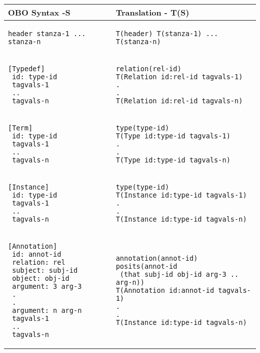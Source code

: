 \begin{scriptsize}
\setlongtables

\begin{longtable}{ | p{7cm} | p{7cm} |}
\hline
OBO Syntax -S & Translation - T(S)
\\ 

\hline
\begin{verbatim}
header stanza-1 ... stanza-n
\end{verbatim}
&
\begin{verbatim}
T(header) T(stanza-1) ... T(stanza-n)
\end{verbatim}
\\

\hline
\begin{verbatim}
[Typedef]
 id: type-id
 tagvals-1
 ..
 tagvals-n
\end{verbatim}
&
\begin{verbatim}
relation(rel-id)
T(Relation id:rel-id tagvals-1)
.
.
T(Relation id:rel-id tagvals-n)
\end{verbatim}
\\

\hline
\begin{verbatim}
[Term]
 id: type-id
 tagvals-1
 ..
 tagvals-n
\end{verbatim}
&
\begin{verbatim}
type(type-id)
T(Type id:type-id tagvals-1)
.
.
T(Type id:type-id tagvals-n)
\end{verbatim}
\\

\hline
\begin{verbatim}
[Instance]
 id: type-id
 tagvals-1
 ..
 tagvals-n
\end{verbatim}
&
\begin{verbatim}
type(type-id)
T(Instance id:type-id tagvals-1)
.
.
T(Instance id:type-id tagvals-n)
\end{verbatim}
\\

\hline
\begin{verbatim}
[Annotation]
 id: annot-id
 relation: rel
 subject: subj-id
 object: obj-id
 argument: 3 arg-3
 .
 .
 argument: n arg-n
 tagvals-1
 ..
 tagvals-n
\end{verbatim}
&
\begin{verbatim}
annotation(annot-id)
posits(annot-id 
 (that subj-id obj-id arg-3 .. arg-n))
T(Annotation id:annot-id tagvals-1)
.
.
T(Instance id:type-id tagvals-n)
\end{verbatim}
\\


\end{longtable}
\end{scriptsize}

